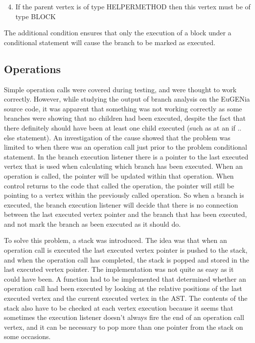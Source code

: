 \begin{enumerate}
\setcounter{enumi}{3}
\item If the parent vertex is of type HELPERMETHOD then this vertex must be of type BLOCK
\end{enumerate}

The additional condition ensures that only the execution of a block under a conditional statement will cause the branch to be marked as executed.

\subsection{Operations}

Simple operation calls were covered during testing, and were thought to work correctly. However, while studying the output of branch analysis on the EuGENia source code, it was apparent that something was not working correctly as some branches were showing that no children had been executed, despite the fact that there definitely should have been at least one child executed (such as at an if .. else statement). An investigation of the cause showed that the problem was limited to when there was an operation call just prior to the problem conditional statement. In the branch execution listener there is a pointer to the last executed vertex that is used when calculating which branch has been executed. When an operation is called, the pointer will be updated within that operation. When control returns to the code that called the operation, the pointer will still be pointing to a vertex within the previously called operation. So when a branch is executed, the branch execution listener will decide that there is no connection between the last executed vertex pointer and the branch that has been executed, and not mark the branch as been executed as it should do.

To solve this problem, a stack was introduced. The idea was that when an operation call is executed the last executed vertex pointer is pushed to the stack, and when the operation call has completed, the stack is popped and stored in the last executed vertex pointer. The implementation was not quite as easy as it could have been. A function had to be implemented that determined whether an operation call had been executed by looking at the relative positions of the last executed vertex and the current executed vertex in the AST. The contents of the stack also have to be checked at each vertex execution because it seems that sometimes the execution listener doesn't always fire the end of an operation call vertex, and it can be necessary to pop more than one pointer from the stack on some occasions. 

